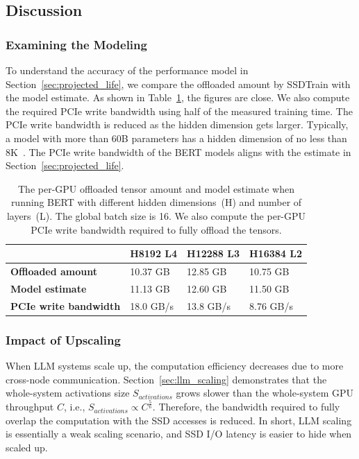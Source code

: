 \subsection{Discussion}
\label{sec:discussion}
\subsubsection{Examining the Modeling}
To understand the accuracy of the performance model in Section~\ref{sec:projected_life}, we compare the offloaded amount by SSDTrain with the model estimate. As shown in Table~\ref{tab:eval_activations}, the figures are close. We also compute the required PCIe write bandwidth using half of the measured training time. The PCIe write bandwidth is reduced as the hidden dimension gets larger. Typically, a model with more than 60B parameters has a hidden dimension of no less than 8K~\cite{touvronLlamaOpenFoundation2023,jordanhoffmannTrainingComputeOptimalLarge2022}. The PCIe write bandwidth of the BERT models aligns with the estimate in Section~\ref{sec:projected_life}.



\begin{table}[!htbp]
\centering
\begin{tabular}{llll}
\toprule
                              & H8192 L4  & H12288 L3 & H16384 L2 \\\midrule
\textbf{Offloaded amount}     & 10.37 GB  & 12.85 GB  & 10.75 GB  \\
\textbf{Model estimate}       & 11.13 GB  & 12.60 GB   & 11.50 GB   \\
\textbf{PCIe write bandwidth} & 18.0 GB/s & 13.8 GB/s & 8.76 GB/s \\ \bottomrule
\end{tabular}
\caption{The per-GPU offloaded tensor amount and model estimate when running BERT with different hidden dimensions~(H) and number of layers~(L). The global batch size is 16. We also compute the per-GPU PCIe write bandwidth required to fully offload the tensors. \label{tab:eval_activations}}
\end{table}

\subsubsection{Impact of Upscaling} 
When LLM systems scale up, the computation efficiency decreases due to more cross-node communication.
Section~\ref{sec:llm_scaling} demonstrates that the whole-system activations size $S_{activations}$ grows slower than the whole-system GPU throughput $C$, i.e., $S_{activations} \propto C^{\frac{5}{6}}$. Therefore, the bandwidth required to fully overlap the computation with the SSD accesses is reduced.
In short, LLM scaling is essentially a weak scaling scenario, and SSD I/O latency is easier to hide when scaled up. 

